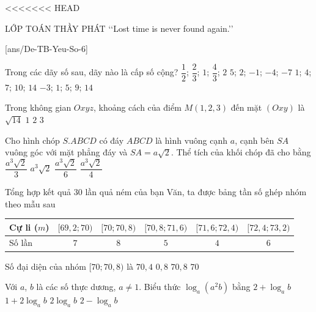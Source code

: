 <<<<<<< HEAD
\begin{name}
	{\tenchude}
	{\tendethi}
	{LỚP TOÁN THẦY PHÁT}
	{\lq\lq Lost time is never found again.\rq\rq}
\end{name}

[ans/De-TB-Yeu-So-6]
\TN
\begin{ex}%
	Trong các dãy số sau, dãy nào là cấp số cộng?
	\choice
	{$\dfrac{1}{2}$; $\dfrac{2}{3}$; $1$; $\dfrac{4}{3}$; $2$}
	{\True $5$; $2$; $-1$; $-4$; $-7$}
	{$1$; $4$; $7$; $10$; $14$}
	{$-3$; $1$; $5$; $9$; $14$}
\end{ex}

\begin{ex}%
	Trong không gian $Oxyz$, khoảng cách của điểm $M(1,2,3)$ đến mặt $(Oxy)$ là
	\choice
	{$\sqrt{14}$}
	{$1$}
	{$2$}
	{\True $3$}
\end{ex}

\begin{ex}%
	Cho hình chóp $S.ABCD$ có đáy $ABCD$ là hình vuông cạnh $a$, cạnh bên $SA$ vuông góc với mặt phẳng đáy và $SA=a\sqrt{2}$. Thể tích của khối chóp đã cho bằng
	\choice
	{\True $\dfrac{a^3\sqrt{2}}{3}$}
	{$a^3\sqrt{2}$}
	{$\dfrac{a^3\sqrt{2}}{6}$}
	{$\dfrac{a^3\sqrt{2}}{4}$}
\end{ex}

\begin{ex}%
	Tổng hợp kết quả $30$ lần quả ném của bạn Văn, ta được bảng tần số ghép nhóm theo mẫu sau
	\begin{longtable}{|l|c|c|c|c|c|}
		\hline
		Cự li ($m$) & $[69{,}2;70)$ & $[70;70{,}8)$ & $[70{,}8;71{,}6)$ & $[71{,}6;72{,}4)$ & $[72{,}4;73{,}2)$ \\
		\hline
		Số lần & $7$ & $8$ & $5$ & $4$ & $6$ \\
		\hline
	\end{longtable}
	Số đại diện của nhóm $[70;70{,}8)$ là
	\choice
	{\True $70{,}4$}
	{$0{,}8$}
	{$70{,}8$}
	{$70$}
\end{ex}

\begin{ex}%
	Với $a$, $b$ là các số thực dương, $a\ne1$. Biểu thức $\log _a\left(a^2b\right)$ bằng
	\choice
	{\True $2+\log _ab$}
	{$1+2\log _ab$}
	{$2\log _ab$}
	{$2-\log _ab$}
\end{ex}

